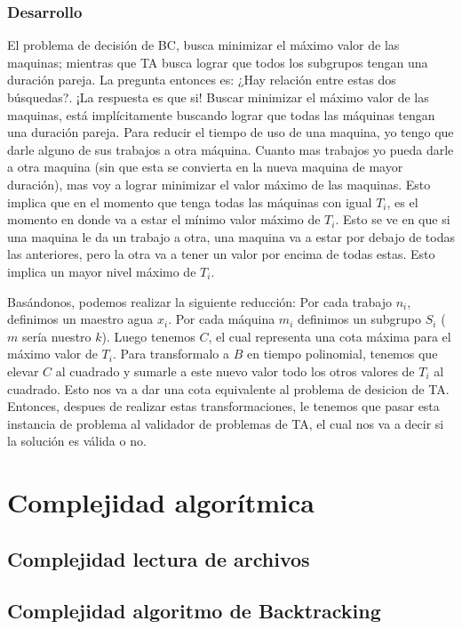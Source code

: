 \documentclass{article}
\begin{document}
\subsubsection{Desarrollo}
El problema de decisión de BC, busca minimizar el máximo valor de las maquinas; mientras que TA busca lograr que todos los subgrupos tengan una duración pareja. La pregunta entonces es: ¿Hay relación entre estas dos búsquedas?. ¡La respuesta es que si! Buscar minimizar el máximo valor de las maquinas, está implícitamente buscando lograr que todas las máquinas tengan una duración pareja.
Para reducir el tiempo de uso de una maquina, yo tengo que darle alguno de sus trabajos a otra máquina. Cuanto mas trabajos yo pueda darle a otra maquina (sin que esta se convierta en la nueva maquina de mayor duración), mas voy a lograr minimizar el valor máximo de las maquinas.
Esto implica que en el momento que tenga todas las máquinas con igual $T_i$, es el momento en donde va a estar el mínimo valor máximo de $T_i$. Esto se ve en que si una maquina le da un trabajo a otra, una maquina va a estar por debajo de todas las anteriores, pero la otra va a tener un valor por encima de todas estas. Esto implica un mayor nivel máximo de $T_i$.

Basándonos, podemos realizar la siguiente reducción:
Por cada trabajo $n_i$, definimos un maestro agua $x_i$. Por cada máquina $m_i$ definimos un subgrupo $S_i$ ($m$ sería nuestro $k$).
Luego tenemos $C$, el cual representa una cota máxima para el máximo valor de $T_i$. Para transformalo a $B$ en tiempo polinomial, tenemos que elevar $C$ al cuadrado y sumarle a este nuevo valor todo los otros valores de $T_i$ al cuadrado. Esto nos va a dar una cota equivalente al problema de desicion de TA.
Entonces, despues de realizar estas transformaciones, le tenemos que pasar esta instancia de problema al validador de problemas de TA, el cual nos va a decir si la solución es válida o no.

\section{Complejidad algorítmica}
\subsection{Complejidad lectura de archivos}
\subsection{Complejidad algoritmo de Backtracking}
\end{document}
